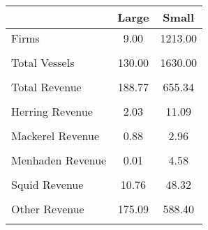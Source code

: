 \begin{tabular}{l*{2}{c}}
\hline\hline
                &    Large&    Small\\
\hline
Firms           &     9.00&  1213.00\\
                &         &         \\
Total Vessels   &   130.00&  1630.00\\
                &         &         \\
Total Revenue   &   188.77&   655.34\\
                &         &         \\
Herring Revenue &     2.03&    11.09\\
                &         &         \\
Mackerel Revenue&     0.88&     2.96\\
                &         &         \\
Menhaden Revenue&     0.01&     4.58\\
                &         &         \\
Squid Revenue   &    10.76&    48.32\\
                &         &         \\
Other Revenue   &   175.09&   588.40\\
                &         &         \\
\hline\hline
\end{tabular}
